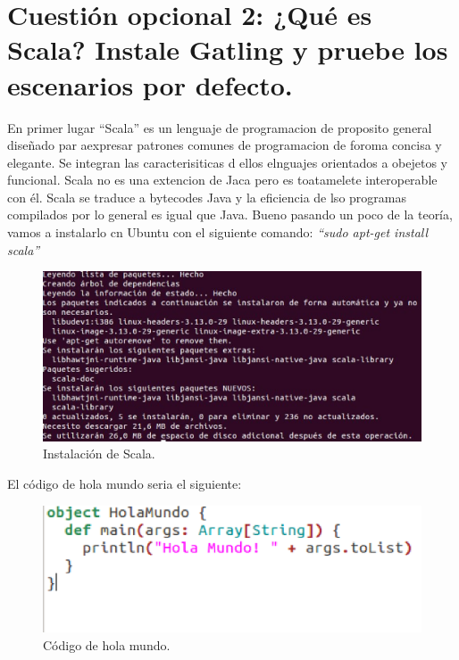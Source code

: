 \section*{Cuestión opcional 2: ¿Qué es Scala? Instale Gatling y pruebe los escenarios por defecto.}

En primer lugar “Scala” es un lenguaje de programacion de proposito general diseñado par aexpresar patrones comunes de programacion de foroma concisa y elegante. Se integran las caracterisiticas d ellos elnguajes orientados a obejetos y funcional. Scala no es una extencion de Jaca pero es toatamelete interoperable con él.
Scala se traduce a bytecodes Java y la eficiencia de lso programas compilados por lo general es igual que Java.
Bueno pasando un poco de la teoría, vamos a instalarlo cn Ubuntu con el siguiente comando:
\textit{“sudo apt-get install scala”}

\begin{figure}[H]
\begin{center}
\includegraphics[scale=0.4]{imagenes/opcional2-1.eps}
\caption{Instalación de Scala.}
\end{center}
\end{figure}

El código de hola mundo seria el siguiente:\\
\begin{figure}[H]
\begin{center}
\includegraphics[scale=0.4]{imagenes/opcional2-2.eps}
\caption{Código de hola mundo.}
\end{center}
\end{figure}

